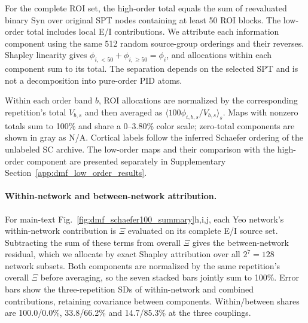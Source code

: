 \documentclass[fleqn,10pt]{wlscirep}
\begin{document}
For the complete ROI set, the high-order total equals the sum of reevaluated binary Syn over original SPT nodes containing at least 50 ROI blocks. The low-order total includes local E/I contributions. We attribute each information component using the same 512 random source-group orderings and their reverses. Shapley linearity gives $\phi_{i,<50}+\phi_{i,\geq50}=\phi_i$, and allocations within each component sum to its total. The separation depends on the selected SPT and is not a decomposition into pure-order PID atoms.

Within each order band $b$, ROI allocations are normalized by the corresponding repetition's total $V_{b,s}$ and then averaged as $\langle100\phi_{i,b,s}/V_{b,s}\rangle_s$. Maps with nonzero totals sum to 100\% and share a 0--3.80\% color scale; zero-total components are shown in gray as N/A. Cortical labels follow the inferred Schaefer ordering of the unlabeled SC archive. The low-order maps and their comparison with the high-order component are presented separately in Supplementary Section~\ref{app:dmf_low_order_results}.

\paragraph{Within-network and between-network attribution.}
For main-text Fig.~\ref{fig:dmf_schaefer100_summary}h,i,j, each Yeo network's within-network contribution is $\Xi$ evaluated on its complete E/I source set. Subtracting the sum of these terms from overall $\Xi$ gives the between-network residual, which we allocate by exact Shapley attribution over all $2^7=128$ network subsets. Both components are normalized by the same repetition's overall $\Xi$ before averaging, so the seven stacked bars jointly sum to 100\%. Error bars show the three-repetition SDs of within-network and combined contributions, retaining covariance between components. Within/between shares are 100.0/0.0\%, 33.8/66.2\% and 14.7/85.3\% at the three couplings.


\end{document}

